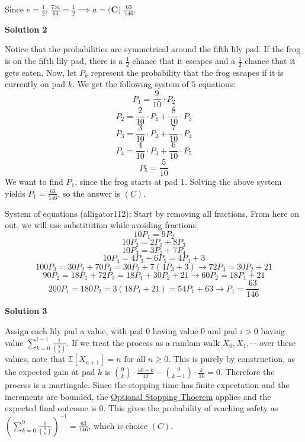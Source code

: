 \begin{enumerate}
 Since $e=\frac{1}{2}$, $\frac{73a}{63}=\frac{1}{2}\implies a=\boxed{\textbf{(C) }\frac{63}{146}}$.

 



\textbf{Solution 2}

Notice that the probabilities are symmetrical around the fifth lily pad. If the frog is on the fifth lily pad, there is a $\frac{1}{2}$ chance that it escapes and a $\frac{1}{2}$ chance that it gets eaten. Now, let $P_k$ represent the probability that the frog escapes if it is currently on pad $k$. We get the following system of $5$ equations:
 \[P_1=\frac{9}{10}\cdot P_2\]
 \[P_2=\frac{2}{10}\cdot P_1 + \frac{8}{10}\cdot P_3\]
 \[P_3=\frac{3}{10}\cdot P_2 + \frac{7}{10}\cdot P_4\]
 \[P_4=\frac{4}{10}\cdot P_3 + \frac{6}{10}\cdot P_5\]
 \[P_5=\frac{5}{10}\]We want to find $P_1$, since the frog starts at pad $1$. Solving the above system yields $P_1=\frac{63}{146}$, so the answer is $\boxed{(C)}$.

 System of equations (alligator112): Start by removing all fractions. From here on out, we will use substitution while avoiding fractions.
 \[10P_1 = 9P_2\]
 \[10P_2 = 2P_1 + 8P_3\]
 \[10P_3 = 3P_2 + 7P_4\]
 \[10P_4 = 4P_3 + 6P_5 = 4P_3 + 3\]
 \[100 P_3 = 30P_2 + 70P_4 = 30P_2 + 7(4P_3 + 3) \rightarrow 72P_3 = 30P_2 + 21\]
 \[90P_2 = 18P_1 + 72P_3 = 18P_1 + 30P_2 + 21 \rightarrow 60P_2 = 18P_1 + 21\]
 \[200P_1 = 180P_2 = 3(18P_1 + 21) = 54P_1 + 63 \rightarrow P_1 = \frac{63}{146}\]




\textbf{Solution 3}

Assign each lily pad a value, with pad $0$ having value $0$ and pad $i > 0$ having value $\sum_{k=0}^{i-1}\frac{1}{\binom{9}{k}}$. If we treat the process as a random walk $X_0, X_1, \cdots$ over these values, note that $\mathbb{E}[X_{n+1}] = n$ for all $n \ge 0$. This is purely by construction, as the expected gain at pad $k$ is $\binom{9}{k}\cdot \frac{10-k}{10} - \binom{9}{k-1}\cdot \frac{k}{10} = 0$. Therefore the process is a martingale. Since the stopping time has finite expectation and the increments are bounded, the \href{https://en.wikipedia.org/wiki/Optional\_stopping\_theorem}{Optional Stopping Thoerem} applies and the expected final outcome is $0$. This gives the probability of reaching safety as $\left(\sum_{k=0}^{9}\frac{1}{\binom{9}{k}}\right)^{-1} = \frac{63}{146}$, which is choice $\boxed{(C)}$.

 



\end{enumerate}

